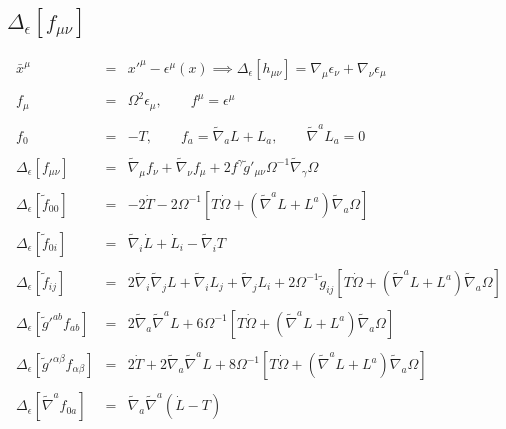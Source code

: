 \documentclass[10pt,letterpaper]{article}
\numberwithin{equation}{section}
\begin{document}
\subsection{$\Delta_{\epsilon}[f_{\mu\nu}]$}
\begin{eqnarray}
\bar x^\mu &=&  x'^\mu - \epsilon^\mu(x) \implies \Delta_\epsilon \left[ h_{\mu\nu}\right] = \nabla_\mu \epsilon_\nu +\nabla_\nu \epsilon_\mu
\label{gaugetrans2}
\\ \nonumber\\
f_{\mu} &=& \Omega^2 \epsilon_\mu,\qquad f^\mu = \epsilon^\mu
\\ \nonumber\\
f_0 &=& -T,\qquad f_a = \tilde\nabla_a L + L_a,\qquad \tilde\nabla^a L_a =0
\\ \nonumber\\
\Delta_\epsilon\left[ f_{\mu\nu} \right]  &=& \tilde\nabla_{\mu }f_{\nu} + \tilde\nabla_{\nu}f_{\mu} + 2 f^{\gamma } \tilde g'_{\mu\nu} \Omega^{-1} \tilde\nabla_{\gamma }\Omega
\\ \nonumber\\
\Delta_\epsilon\left[ \tilde f_{00} \right] &=&  -2\dot T - 2\Omega^{-1} \left[ T \dot \Omega + (\tilde\nabla^a L + L^a)\tilde\nabla_a \Omega\right]
\\ \nonumber\\
\Delta_\epsilon\left[ \tilde f_{0i} \right]  &=&   \tilde\nabla_i \dot L +\dot L_i - \tilde\nabla_i T
\\ \nonumber\\
\Delta_\epsilon\left[ \tilde f_{ij}  \right]  &=& 2\tilde\nabla_i\tilde\nabla_j L + \tilde\nabla_{i }L_{j } + \tilde\nabla_{j}L_{i} + 2\Omega^{-1} \tilde g_{ij} \left[ T \dot \Omega + (\tilde\nabla^a L + L^a)\tilde\nabla_a \Omega\right]
\\ \nonumber\\
\Delta_\epsilon\left[ \tilde g'^{ab} f_{ab} \right]  &=& 2\tilde\nabla_a\tilde\nabla^a L + 6\Omega^{-1}\left[ T \dot \Omega + (\tilde\nabla^a L + L^a)\tilde\nabla_a \Omega\right]
\\ \nonumber\\
\Delta_\epsilon\left[ \tilde g'^{\alpha\beta} f_{\alpha\beta} \right]  &=& 2\dot T+ 2\tilde\nabla_a\tilde\nabla^a L + 8\Omega^{-1}\left[ T \dot \Omega + (\tilde\nabla^a L + L^a)\tilde\nabla_a \Omega\right]
\\ \nonumber\\
\Delta_\epsilon\left[ \tilde\nabla^a f_{0a} \right] &=& \tilde\nabla_a\tilde\nabla^a ( \dot L- T)
\\ \nonumber\\

\end{eqnarray}
\end{document}
